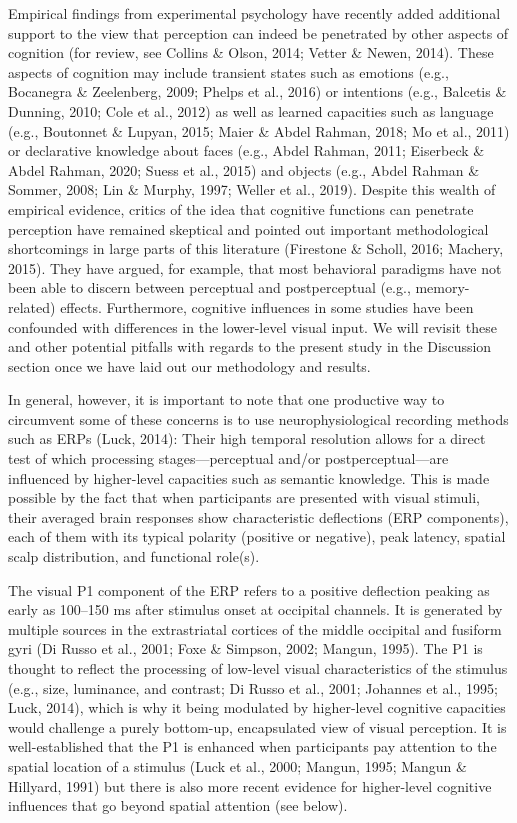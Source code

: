 \documentclass[
  english,
  doc,12pt,twoside,floatsintext]{apa7}
\begin{document}
Empirical findings from experimental psychology have recently added additional support to the view that perception can indeed be penetrated by other aspects of cognition (for review, see Collins \& Olson, 2014; Vetter \& Newen, 2014). These aspects of cognition may include transient states such as emotions (e.g., Bocanegra \& Zeelenberg, 2009; Phelps et al., 2016) or intentions (e.g., Balcetis \& Dunning, 2010; Cole et al., 2012) as well as learned capacities such as language (e.g., Boutonnet \& Lupyan, 2015; Maier \& Abdel Rahman, 2018; Mo et al., 2011) or declarative knowledge about faces (e.g., Abdel Rahman, 2011; Eiserbeck \& Abdel Rahman, 2020; Suess et al., 2015) and objects (e.g., Abdel Rahman \& Sommer, 2008; Lin \& Murphy, 1997; Weller et al., 2019). Despite this wealth of empirical evidence, critics of the idea that cognitive functions can penetrate perception have remained skeptical and pointed out important methodological shortcomings in large parts of this literature (Firestone \& Scholl, 2016; Machery, 2015). They have argued, for example, that most behavioral paradigms have not been able to discern between perceptual and postperceptual (e.g., memory-related) effects. Furthermore, cognitive influences in some studies have been confounded with differences in the lower-level visual input. We will revisit these and other potential pitfalls with regards to the present study in the Discussion section once we have laid out our methodology and results.

In general, however, it is important to note that one productive way to circumvent some of these concerns is to use neurophysiological recording methods such as ERPs (Luck, 2014): Their high temporal resolution allows for a direct test of which processing stages---perceptual and/or postperceptual---are influenced by higher-level capacities such as semantic knowledge. This is made possible by the fact that when participants are presented with visual stimuli, their averaged brain responses show characteristic deflections (ERP components), each of them with its typical polarity (positive or negative), peak latency, spatial scalp distribution, and functional role(s).

The visual P1 component of the ERP refers to a positive deflection peaking as early as 100--150 ms after stimulus onset at occipital channels. It is generated by multiple sources in the extrastriatal cortices of the middle occipital and fusiform gyri (Di Russo et al., 2001; Foxe \& Simpson, 2002; Mangun, 1995). The P1 is thought to reflect the processing of low-level visual characteristics of the stimulus (e.g., size, luminance, and contrast; Di Russo et al., 2001; Johannes et al., 1995; Luck, 2014), which is why it being modulated by higher-level cognitive capacities would challenge a purely bottom-up, encapsulated view of visual perception. It is well-established that the P1 is enhanced when participants pay attention to the spatial location of a stimulus (Luck et al., 2000; Mangun, 1995; Mangun \& Hillyard, 1991) but there is also more recent evidence for higher-level cognitive influences that go beyond spatial attention (see below).
\end{document}
